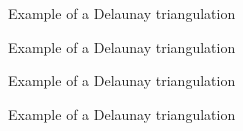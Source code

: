 \documentclass[lettersize,journal,english]{IEEEtran}
\begin{document}
\begin{figure}[!t]
    \centering
    \caption{Example of a Delaunay triangulation}
    \label{fig:crit_pts}
\end{figure}

\begin{figure}[!b]
    \centering
    \caption{Example of a Delaunay triangulation}
    \label{fig:crit_dis}
\end{figure}

\begin{figure}[!t]
    \centering
    \caption{Example of a Delaunay triangulation}
    \label{fig:crit_ang}
\end{figure}

\begin{figure}[!b]
    \centering
    \caption{Example of a Delaunay triangulation}
    \label{fig:crit_qua}
\end{figure}
\end{document}
